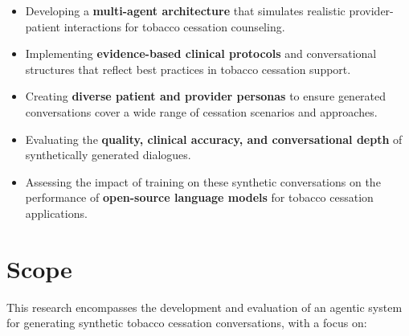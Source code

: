 \begin{itemize}[label=$\bullet$, leftmargin=1cm, itemsep=0.2cm]
\item Developing a \textbf{multi-agent architecture} that simulates realistic provider-patient interactions for tobacco cessation counseling.

\item Implementing \textbf{evidence-based clinical protocols} and conversational structures that reflect best practices in tobacco cessation support.

\item Creating \textbf{diverse patient and provider personas} to ensure generated conversations cover a wide range of cessation scenarios and approaches.

\item Evaluating the \textbf{quality, clinical accuracy, and conversational depth} of synthetically generated dialogues.

\item Assessing the impact of training on these synthetic conversations on the performance of \textbf{open-source language models} for tobacco cessation applications.
\end{itemize}

\section{Scope}
\begin{minipage}{\textwidth}
This research encompasses the development and evaluation of an agentic system for generating synthetic tobacco cessation conversations, with a focus on:
\end{minipage}

